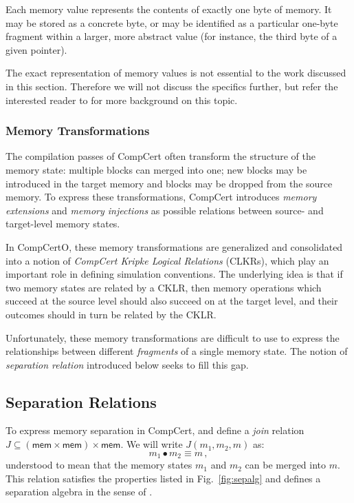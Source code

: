 \documentclass[acmsmall,screen,review,anonymous]{acmart}
\newcommand{\kw}[1]{\ensuremath{ \mathsf{#1} }}
\begin{document}
Each memory value represents the contents of exactly one byte of memory.
It may be stored as a concrete byte,
or may be identified as a particular one-byte fragment
within a larger, more abstract value
(for instance, the third byte of a given pointer).

The exact representation of memory values
is not essential to the work discussed in this section.
Therefore
we will not discuss the specifics further,
but refer the interested reader to \citet{compcertmmv2}
for more background on this topic.

\subsubsection{Memory Transformations}

The compilation passes of CompCert
often transform the structure of the memory state:
multiple blocks can merged into one;
new blocks may be introduced in the target memory
and blocks may be dropped from the source memory.
To express these transformations,
CompCert introduces \emph{memory extensions} and \emph{memory injections}
as possible relations between source- and target-level memory states.

In CompCertO,
these memory transformations are generalized and consolidated
into a notion of \emph{CompCert Kripke Logical Relations} (CLKRs),
which play an important role in defining simulation conventions.
The underlying idea is that
if two memory states are related by a CKLR,
then memory operations which succeed at the source level
should also succeed on at the target level,
and their outcomes should in turn be related
by the CKLR.

Unfortunately,
these memory transformations are difficult to use
to express the relationships between
different \emph{fragments} of a single memory state.
The notion of \emph{separation relation} introduced below
seeks to fill this gap.

\subsection{Separation Relations} %

To express memory separation in CompCert,
and define a \emph{join} relation
$J \subseteq (\kw{mem} \times \kw{mem}) \times \kw{mem}$.
We will write $J(m_1, m_2, m)$ as:
\[
  m_1 \bullet m_2 \equiv m
  \,,
\]
understood to mean that
the memory states $m_1$ and $m_2$
can be merged into $m$.
This relation satisfies the properties listed in Fig.~\ref{fig:sepalg}
and defines a separation algebra in the sense of \citet{freshlook}.
\end{document}
